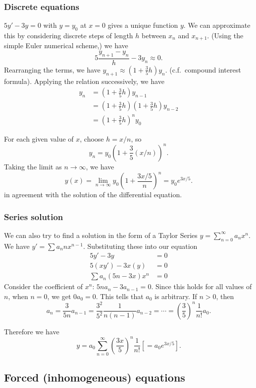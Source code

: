 \documentclass[a4paper]{article}
\begin{document}
\subsubsection{Discrete equations}
$5y' - 3y = 0$ with $y = y_0$ at $x = 0$ gives a unique function $y$. We can approximate this by considering discrete steps of length $h$ between $x_n$ and $x_{n+1}$. (Using the simple Euler numerical scheme,) we have
\[
5\frac{y_{n+1} - y_n}{h} - 3y_n \approx 0.
\]
Rearranging the terms, we have $y_{n+1} \approx (1 + \frac{3}{5}h)y_n$. (c.f.\ compound interest formula). Applying the relation successively, we have 
\begin{align*}
  y_n &= \left(1 + \frac{3}{5}h\right)y_{n - 1}\\
  &= \left(1 + \frac{3}{5}h\right)\left(1 + \frac{3}{5}h\right)y_{n - 2}\\
  &= \left(1 + \frac{3}{5}h\right)^ny_0
\end{align*}

For each given value of $x$, choose $h = x/n$, so
\[
y_n = y_0\left(1 + \frac{3}{5}(x/n)\right)^n.
\]
Taking the limit as $n\to \infty$, we have
\[
y(x) = \lim_{n\to \infty} y_0\left(1 + \frac{3x/5}{n}\right)^n = y_0 e^{3x/5}.
\]
in agreement with the solution of the differential equation.


\subsubsection{Series solution}
We can also try to find a solution in the form of a Taylor Series $y = \sum\limits_{n=0}^\infty a_nx^n$. We have $y' = \sum a_nnx^{n-1}$. Substituting these into our equation
\begin{align*}
  5y' - 3y &= 0\\
  5(xy')  - 3x(y) &= 0\\
  \sum a_n(5n - 3x)x^n &= 0
\end{align*}
Consider the coefficient of $x^n$: $5n a_n - 3 a_{n-1} = 0$. Since this holds for all values of $n$, when $n = 0$, we get $0a_0 = 0$. This tells that $a_0$ is arbitrary. If $n>0$, then
\[
a_n = \frac{3}{5n}a_{n-1} = \frac{3^2}{5^2}\frac{1}{n(n-1)}a_{n-2} = \cdots = \left(\frac{3}{5}\right)^n \frac{1}{n!}a_0.
\]

Therefore we have
\[
y = a_0\sum_{n = 0}^\infty \left(\frac{3x}{5}\right)^n\frac{1}{n!} \left[= a_0 e^{3x/5}\right].
\]

\subsection{Forced (inhomogeneous) equations}
\end{document}
